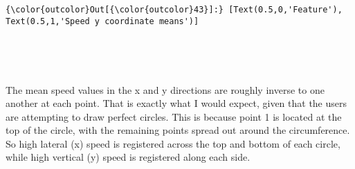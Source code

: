 \documentclass[11pt]{article}
\begin{document}
\begin{Verbatim}[commandchars=\\\{\}]
{\color{outcolor}Out[{\color{outcolor}43}]:} [Text(0.5,0,'Feature'), Text(0.5,1,'Speed y coordinate means')]
\end{Verbatim}
            
    \begin{center}
    \end{center}
    { \hspace*{\fill} \\}
    
    \begin{center}
    \end{center}
    { \hspace*{\fill} \\}
    
    The mean speed values in the x and y directions are roughly inverse to
one another at each point. That is exactly what I would expect, given
that the users are attempting to draw perfect circles. This is because
point 1 is located at the top of the circle, with the remaining points
spread out around the circumference. So high lateral (x) speed is
registered across the top and bottom of each circle, while high vertical
(y) speed is registered along each side.
\end{document}
